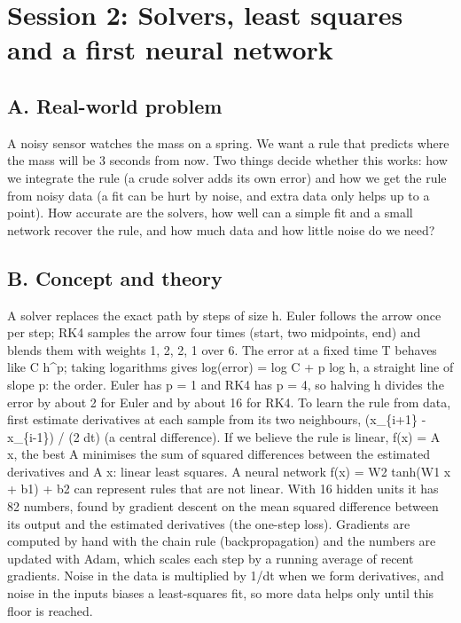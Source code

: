 \documentclass[11pt,a4paper]{article}
\begin{document}
\section{Session 2: Solvers, least squares and a first neural network}

\subsection*{A. Real-world problem}
A noisy sensor watches the mass on a spring. We want a rule that predicts where the mass will be 3 seconds from now. Two things decide whether this works: how we integrate the rule (a crude solver adds its own error) and how we get the rule from noisy data (a fit can be hurt by noise, and extra data only helps up to a point). How accurate are the solvers, how well can a simple fit and a small network recover the rule, and how much data and how little noise do we need?

\subsection*{B. Concept and theory}
A solver replaces the exact path by steps of size h. Euler follows the arrow once per step; RK4 samples the arrow four times (start, two midpoints, end) and blends them with weights 1, 2, 2, 1 over 6. The error at a fixed time T behaves like C h\textasciicircum{}p; taking logarithms gives log(error) = log C + p log h, a straight line of slope p: the order. Euler has p = 1 and RK4 has p = 4, so halving h divides the error by about 2 for Euler and by about 16 for RK4. To learn the rule from data, first estimate derivatives at each sample from its two neighbours, (x\_\{i+1\} - x\_\{i-1\}) / (2 dt) (a central difference). If we believe the rule is linear, f(x) = A x, the best A minimises the sum of squared differences between the estimated derivatives and A x: linear least squares. A neural network f(x) = W2 tanh(W1 x + b1) + b2 can represent rules that are not linear. With 16 hidden units it has 82 numbers, found by gradient descent on the mean squared difference between its output and the estimated derivatives (the one-step loss). Gradients are computed by hand with the chain rule (backpropagation) and the numbers are updated with Adam, which scales each step by a running average of recent gradients. Noise in the data is multiplied by 1/dt when we form derivatives, and noise in the inputs biases a least-squares fit, so more data helps only until this floor is reached.
\end{document}

